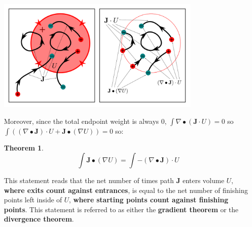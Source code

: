 \documentclass{book}
\newtheorem{thm}{Theorem}
\begin{document}
\begin{center}
\includegraphics[width = 0.75\textwidth]{Boundaries/Path_endpoints/path_volume_intersection_endpoints_2}
\end{center}

Moreover, since the total endpoint weight is always \(0\), \(\int \nabla \bullet (\mathbf{J} \cdot U) = 0\) so \(\int ((\nabla \bullet \mathbf{J}) \cdot U + \mathbf{J} \bullet (\nabla U)) = 0\) so:

\begin{thm}
\[\int \mathbf{J} \bullet (\nabla U) = \int -(\nabla \bullet \mathbf{J}) \cdot U\]
\end{thm}

This statement reads that the net number of times path \(\mathbf{J}\) enters volume \(U\), {\bf where exits count against entrances}, is equal to the net number of finishing points left inside of \(U\), {\bf where starting points count against finishing points}. This statement is referred to as either the {\bf gradient theorem} or the {\bf divergence theorem}.
\end{document}
